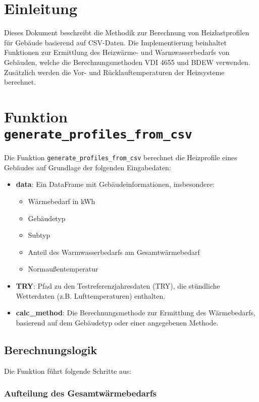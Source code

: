 \section{Einleitung}
Dieses Dokument beschreibt die Methodik zur Berechnung von Heizlastprofilen für Gebäude basierend auf CSV-Daten. Die Implementierung beinhaltet Funktionen zur Ermittlung des Heizwärme- und Warmwasserbedarfs von Gebäuden, welche die Berechnungsmethoden VDI 4655 und BDEW verwenden. Zusätzlich werden die Vor- und Rücklauftemperaturen der Heizsysteme berechnet.

\section{Funktion \texttt{generate\_profiles\_from\_csv}}

Die Funktion \texttt{generate\_profiles\_from\_csv} berechnet die Heizprofile eines Gebäudes auf Grundlage der folgenden Eingabedaten:

\begin{itemize}
    \item \textbf{data}: Ein DataFrame mit Gebäudeinformationen, insbesondere:
    \begin{itemize}
        \item Wärmebedarf in kWh
        \item Gebäudetyp
        \item Subtyp
        \item Anteil des Warmwasserbedarfs am Gesamtwärmebedarf
        \item Normaußentemperatur
    \end{itemize}
    \item \textbf{TRY}: Pfad zu den Testreferenzjahresdaten (TRY), die stündliche Wetterdaten (z.B. Lufttemperaturen) enthalten.
    \item \textbf{calc\_method}: Die Berechnungsmethode zur Ermittlung des Wärmebedarfs, basierend auf dem Gebäudetyp oder einer angegebenen Methode.
\end{itemize}

\subsection{Berechnungslogik}
Die Funktion führt folgende Schritte aus:

\subsubsection{Aufteilung des Gesamtwärmebedarfs}

